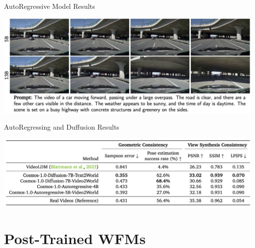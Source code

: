 \documentclass{beamer}
\begin{document}
\begin{frame}{AutoRegressive Model Results}
	\begin{center}
            \includegraphics[width=1.0\textwidth]{./img/auto_arch_results.png}
	\end{center}

\end{frame}

\begin{frame}{AutoRegressing and Duffusion Results}
	\begin{center}
            \includegraphics[width=1.0\textwidth]{./img/wfm_results.png}
	\end{center}
\end{frame}

\section{Post-Trained WFMs }
\end{document}
